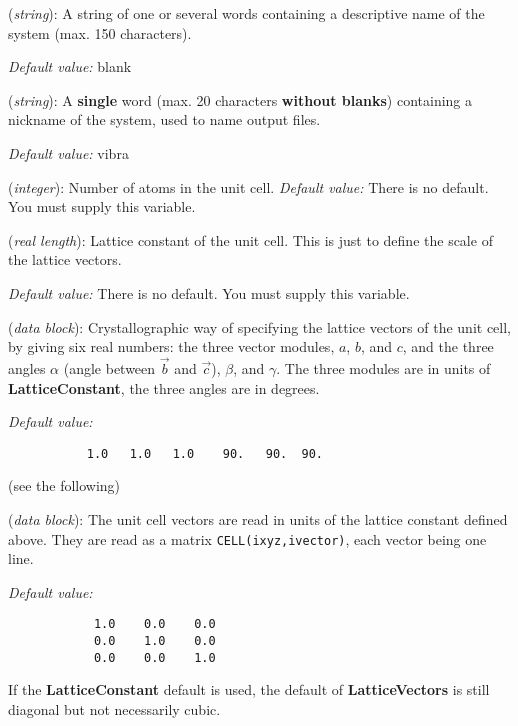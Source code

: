 \begin{description}
\itemsep 10pt
\parsep 0pt

\item[{\bf SystemName}] ({\it string}): 
A string of one or several words containing a descriptive
name of the system (max. 150 characters). 

{\it Default value:} blank

\item[{\bf SystemLabel}] ({\it string}): 
A {\bf single} word (max. 20 characters {\bf without blanks})
containing a nickname of the system, used to name output files.

{\it Default value:} vibra

\item[{\bf NumberOfAtoms}] ({\it integer}):
 Number of atoms in the unit cell.
{\it Default value:} There is no default. You must supply this variable.



\item[{\bf LatticeConstant}] ({\it real length}): Lattice constant
of the unit cell.
This is just to define the scale of the lattice vectors.

{\it Default value:} There is no default. You must supply this variable.

\item[{\bf LatticeParameters}] ({\it data block}):
Crystallographic way of specifying the lattice vectors
of the unit cell, by giving
six real numbers: the three vector modules, $a$, $b$, and $c$, and
the three angles $\alpha$ (angle between $\vec b$ and $\vec c$),
$\beta$, and $\gamma$. The three modules are in units of 
{\bf LatticeConstant}, the three angles are in degrees.

{\it Default value:}
\begin{verbatim}
           1.0   1.0   1.0    90.   90.  90.
\end{verbatim}
\noindent
(see the following)

\item[{\bf LatticeVectors}] ({\it data block}): 
The unit cell vectors are read 
in units of the lattice constant defined above. 
They are read as a matrix {\tt CELL(ixyz,ivector)}, each vector being
one line.

{\it Default value:} 
\begin{verbatim}
            1.0    0.0    0.0 
            0.0    1.0    0.0 
            0.0    0.0    1.0 
\end{verbatim}
\noindent
If the {\bf LatticeConstant} default is used, the default of 
{\bf LatticeVectors} is still diagonal but not necessarily cubic.



\end{description}

